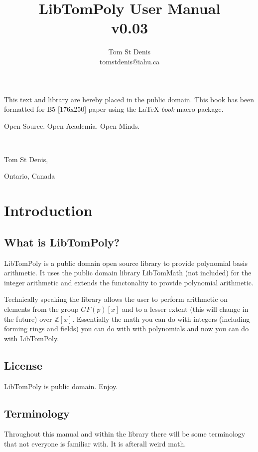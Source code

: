 \documentclass[b5paper]{book}
\def\Z{{\mathbb Z}}
\begin{document}
\frontmatter
\pagestyle{empty}
\title{LibTomPoly User Manual \\ v0.03}
\author{Tom St Denis \\ tomstdenis@iahu.ca}
\maketitle
This text and library are  hereby placed in the public domain.  This book has been 
formatted for B5 [176x250] paper using the \LaTeX{} {\em book} macro package.

\vspace{10cm}

\begin{flushright}Open Source.  Open Academia.  Open Minds.

\mbox{ }

Tom St Denis,

Ontario, Canada
\end{flushright}

\tableofcontents
\listoffigures
\mainmatter
\pagestyle{headings}
\chapter{Introduction}
\section{What is LibTomPoly?}
LibTomPoly is a public domain open source library to provide polynomial basis arithmetic.  It uses the public domain
library LibTomMath (not included) for the integer arithmetic and extends the functonality to provide polynomial arithmetic.

Technically speaking the library allows the user to perform arithmetic on elements from the group $GF(p)[x]$ and to 
a lesser extent (this will change in the future) over $\Z[x]$.  Essentially the math you can do with integers (including
forming rings and fields) you can do with with polynomials and now you can do with LibTomPoly.

\section{License}
LibTomPoly is public domain.  Enjoy.

\section{Terminology}
Throughout this manual and within the library there will be some terminology that not everyone is familiar with.  It is afterall
weird math.
\end{document}

